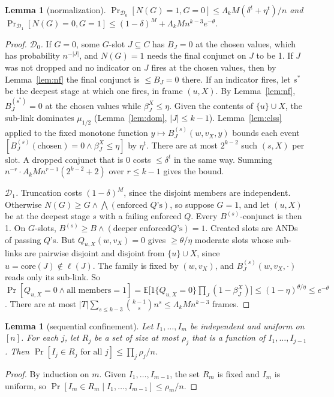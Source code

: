 \documentclass[11pt,a4paper]{article}
\theoremstyle{plain}
\newtheorem{lemma}[theorem]{Lemma}
\theoremstyle{definition}
\theoremstyle{remark}
\newcommand{\Dz}{\mathcal{D}_0}
\newcommand{\Do}{\mathcal{D}_1}
\newcommand{\core}{\mathrm{core}}
\begin{document}
\begin{lemma}[normalization]\label{lem:normk}
$\Pr_{\Dz}[N(G)=1,G=0]\le \Lambda_kM(\delta^t+\eta^t)/n$ and
$\Pr_{\Do}[N(G)=0,G=1]\le(1-\delta)^M+\Lambda_kMn^{k-3}e^{-\theta}$.
\end{lemma}
\begin{proof}
\emph{$\Dz$.} If $G=0$, some $G$-slot $J\subseteq C$ has $B_J=0$ at the chosen values, which has probability
$n^{-|J|}$, and $N(G)=1$ needs the final conjunct on $J$ to be 1. If $J$ was not dropped and no indicator on $J$ fires at the
chosen values, then by Lemma~\ref{lem:nf} the final conjunct is $\le B_J=0$ there. If an indicator fires, let $s^*$ be the deepest stage at which one fires, in frame $(u,X)$.
By Lemma~\ref{lem:nf}, $B^{(s^*)}_J=0$ at the chosen values while $\beta^X_J\le\eta$. Given the contents of
$\{u\}\cup X$, the sub-link dominates $\mu_{1/2}$ (Lemma~\ref{lem:dom}, $|J|\le k-1$). Lemma~\ref{lem:clss} applied
to the fixed monotone function $y\mapsto B^{(s)}_J(w,v_X,y)$ bounds each event
$[B^{(s)}_J(\text{chosen})=0\wedge\beta^X_J\le\eta]$ by $\eta^t$. There are at most $2^{k-2}$ such $(s,X)$ per slot.
A dropped conjunct that is 0 costs $\le\delta^t$ in the same way. Summing $n^{-r}\cdot A_kMn^{r-1}(2^{k-2}+2)$ over
$r\le k-1$ gives the bound.

\emph{$\Do$.} Truncation costs $(1-\delta)^M$, since the disjoint members are independent. Otherwise $N(G)\ge
G\wedge\bigwedge(\text{enforced }Q\text{'s})$, so suppose $G=1$, and let $(u,X)$ be at the deepest stage $s$ with a
failing enforced $Q$. Every $B^{(s)}$-conjunct is then 1. On $G$-slots, $B^{(s)}\ge B\wedge(\text{deeper enforced
}Q\text{'s})=1$. Created slots are ANDs of passing $Q$'s. But $Q_{u,X}(w,v_X)=0$ gives $\ge\theta/\eta$ moderate
slots whose sub-links are pairwise disjoint and disjoint from $\{u\}\cup X$, since $u=\core(J)\notin\ell(J)$. The family
is fixed by $(w,v_X)$, and $B^{(s)}_J(w,v_X,\cdot)$ reads only its sub-link. So
$\Pr[Q_{u,X}=0\wedge\text{all members}=1]=\mathbb E\big[1\{Q_{u,X}=0\}\prod_J(1-\beta^X_J)\big]\le
(1-\eta)^{\theta/\eta}\le e^{-\theta}$. There are at most $|T|\sum_{s\le k-3}\binom{k-1}{s}n^s\le \Lambda_kMn^{k-3}$
frames.
\end{proof}

\begin{lemma}[sequential confinement]\label{lem:seq}
Let $I_1,\dots,I_m$ be independent and uniform on $[n]$. For each $j$, let $R_j$ be a set of size at most $\rho_j$
that is a function of $I_1,\dots,I_{j-1}$. Then $\Pr[I_j\in R_j\text{ for all }j]\le\prod_j\rho_j/n$.
\end{lemma}
\begin{proof}
By induction on $m$. Given $I_1,\dots,I_{m-1}$, the set $R_m$ is fixed and $I_m$ is uniform, so
$\Pr[I_m\in R_m\mid I_1,\dots,I_{m-1}]\le\rho_m/n$.
\end{proof}
\end{document}
